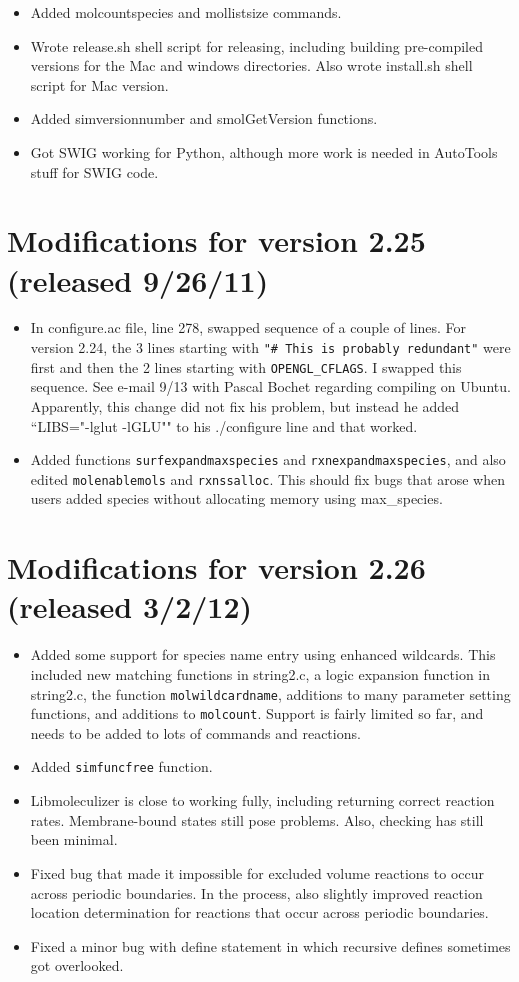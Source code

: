 \documentclass {scrbook}
\newcommand {\ttt} {\texttt}
\begin{document}
\begin{itemize}
\item Added molcountspecies and mollistsize commands.
\item Wrote release.sh shell script for releasing, including building pre-compiled versions for the Mac and windows directories. Also wrote install.sh shell script for Mac version.
\item Added simversionnumber and smolGetVersion functions.
\item Got SWIG working for Python, although more work is needed in AutoTools stuff for SWIG code.
\end{itemize}

\section{Modifications for version 2.25 (released 9/26/11)}
\begin{itemize}
\item In configure.ac file, line 278, swapped sequence of a couple of lines. For version 2.24, the 3 lines starting with \ttt{"\# This is probably redundant"} were first and then the 2 lines starting with \ttt{OPENGL\_CFLAGS}. I swapped this sequence. See e-mail 9/13 with Pascal Bochet regarding compiling on Ubuntu. Apparently, this change did not fix his problem, but instead he added ``LIBS="-lglut -lGLU"" to his ./configure line and that worked.
\item Added functions \ttt{surfexpandmaxspecies} and \ttt{rxnexpandmaxspecies}, and also edited \ttt{molenablemols} and \ttt{rxnssalloc}. This should fix bugs that arose when users added species without allocating memory using max\_species.
\end{itemize}

\section{Modifications for version 2.26 (released 3/2/12)}
\begin{itemize}
\item Added some support for species name entry using enhanced wildcards. This included new matching functions in string2.c, a logic expansion function in string2.c, the function \ttt{molwildcardname}, additions to many parameter setting functions, and additions to \ttt{molcount}. Support is fairly limited so far, and needs to be added to lots of commands and reactions.
\item Added \ttt{simfuncfree} function.
\item Libmoleculizer is close to working fully, including returning correct reaction rates. Membrane-bound states still pose problems. Also, checking has still been minimal.
\item Fixed bug that made it impossible for excluded volume reactions to occur across periodic boundaries. In the process, also slightly improved reaction location determination for reactions that occur across periodic boundaries.
\item Fixed a minor bug with define statement in which recursive defines sometimes got overlooked.
\end{itemize}
\end{document}
